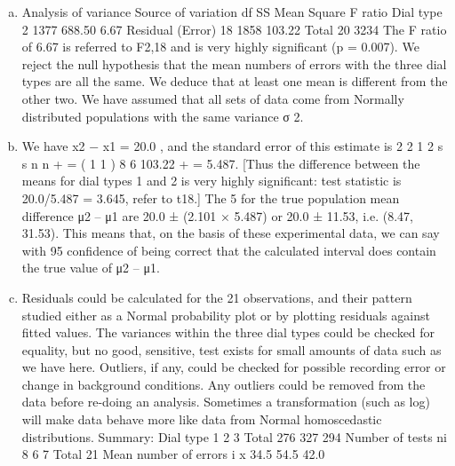 \documentclass[a4paper,12pt]{article}
\begin{document}
\begin{enumerate}[(a)]
\item Analysis of variance
Source of variation df SS Mean Square F ratio
Dial type 2 1377 688.50 6.67
Residual (Error) 18 1858 103.22
Total 20 3234
The F ratio of 6.67 is referred to F2,18 and is very highly significant (p =
0.007). We reject the null hypothesis that the mean numbers of errors with the
three dial types are all the same. We deduce that at least one mean is different
from the other two.
We have assumed that all sets of data come from Normally distributed
populations with the same variance σ 2.
\item We have x2 − x1 = 20.0 , and the standard error of this estimate is
2 2
1 2
s s
n n
+
= ( 1 1 )
8 6 103.22 + = 5.487. [Thus the difference between the means for dial
types 1 and 2 is very highly significant: test statistic is 20.0/5.487 = 3.645,
refer to t18.] The 5%
for the true population mean difference μ2 – μ1 are
20.0 ± (2.101 × 5.487) or 20.0 ± 11.53, i.e. (8.47, 31.53).
This means that, on the basis of these experimental data, we can say with 95%
confidence of being correct that the calculated interval does contain the true
value of μ2 – μ1.

\item Residuals could be calculated for the 21 observations, and their pattern studied
either as a Normal probability plot or by plotting residuals against fitted
values.
The variances within the three dial types could be checked for equality, but no
good, sensitive, test exists for small amounts of data such as we have here.
Outliers, if any, could be checked for possible recording error or change in
background conditions. Any outliers could be removed from the data before
re-doing an analysis.
Sometimes a transformation (such as log) will make data behave more like
data from Normal homoscedastic distributions.
Summary: Dial type 1 2 3
Total 276 327 294
Number of tests ni 8 6 7 Total 21
Mean number of errors i x 34.5 54.5 42.0
\end{enumerate}
\end{document}
